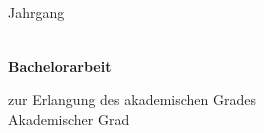 ﻿%
\begin{titlepage} 
	\thispagestyle{empty}
	\setcounter{page}{-2}

\begin{center}
	\hspace{1cm}
\vfill

\begin{minipage}{0.99\textwidth}
\begin{center}
\onehalfspacing
\Huge \textsf{\textbf{\mytitle}}
\end{center}
\end{minipage}

\vfill
	\hspace{1cm} \\ \vspace{2em}
\vfill
	\hspace{1cm} \\ \vspace{2em}
\vfill

\textbf{\textsf{\LARGE{%
\autor \\
\arbeit \\
}}}%

\vspace{1em}
\LARGE{%
Jahrgang \jahrgang \\
}%

\end{center}

	\newpage
	\thispagestyle{empty}
	\hspace{1cm}
	\newpage
	\thispagestyle{empty}
\begin{center}

\vfill

\begin{minipage}{0.99\textwidth}
\begin{center}
\onehalfspacing
\Huge \textsf{\textbf{\mytitle}}
\end{center}
\end{minipage}

\vfill

{\LARGE \textsf{\textbf{\\ Bachelorarbeit}}}

\large
zur Erlangung des akademischen Grades \\
Akademischer Grad


\end{center}
\end{titlepage}
